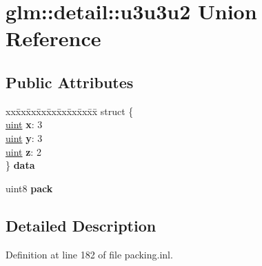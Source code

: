 \hypertarget{unionglm_1_1detail_1_1u3u3u2}{}\section{glm\+:\+:detail\+:\+:u3u3u2 Union Reference}
\label{unionglm_1_1detail_1_1u3u3u2}
\subsection*{Public Attributes}
\begin{DoxyCompactItemize}
\item 
\mbox{\label{unionglm_1_1detail_1_1u3u3u2_a9fece3a4cafc2bb65fdbc1245b6787e8}} 
\begin{tabbing}
xx\=xx\=xx\=xx\=xx\=xx\=xx\=xx\=xx\=\kill
struct \{\\
\mbox{\label{unionglm_1_1detail_1_1u3u3u2_a946b0b4ac6f93b4b3b57735d7f2f0670}} 
\hyperlink{group__core__precision_ga4fd29415871152bfb5abd588334147c8}{uint} {\bfseries x}: 3\\
\mbox{\label{unionglm_1_1detail_1_1u3u3u2_a919376e780d9798a15360323f3b5d9f0}} 
\hyperlink{group__core__precision_ga4fd29415871152bfb5abd588334147c8}{uint} {\bfseries y}: 3\\
\mbox{\label{unionglm_1_1detail_1_1u3u3u2_ae01029b10e3faa76d50b5e0e3bfc6839}} 
\hyperlink{group__core__precision_ga4fd29415871152bfb5abd588334147c8}{uint} {\bfseries z}: 2\\
\} {\bfseries data}\\

\end{tabbing}\item 
\mbox{\label{unionglm_1_1detail_1_1u3u3u2_aea48c2c7d1d3283f3c785daa33551351}} 
uint8 {\bfseries pack}
\end{DoxyCompactItemize}


\subsection{Detailed Description}


Definition at line 182 of file packing.\+inl.



